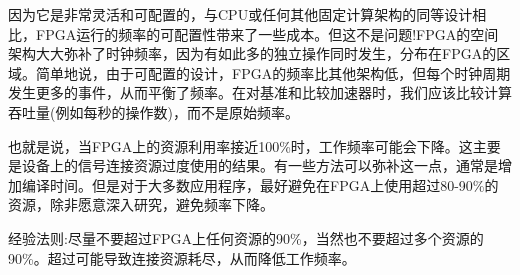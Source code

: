 因为它是非常灵活和可配置的，与CPU或任何其他固定计算架构的同等设计相比，FPGA运行的频率的可配置性带来了一些成本。但这不是问题!FPGA的空间架构大大弥补了时钟频率，因为有如此多的独立操作同时发生，分布在FPGA的区域。简单地说，由于可配置的设计，FPGA的频率比其他架构低，但每个时钟周期发生更多的事件，从而平衡了频率。在对基准和比较加速器时，我们应该比较计算吞吐量(例如每秒的操作数)，而不是原始频率。\par

也就是说，当FPGA上的资源利用率接近100\%时，工作频率可能会下降。这主要是设备上的信号连接资源过度使用的结果。有一些方法可以弥补这一点，通常是增加编译时间。但是对于大多数应用程序，最好避免在FPGA上使用超过80-90\%的资源，除非愿意深入研究，避免频率下降。\par

\begin{tcolorbox}[colback=red!5!white,colframe=red!75!black]
经验法则:尽量不要超过FPGA上任何资源的90\%，当然也不要超过多个资源的90\%。超过可能导致连接资源耗尽，从而降低工作频率。
\end{tcolorbox}










